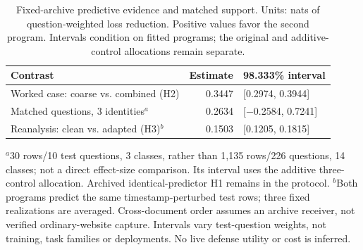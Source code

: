 \begin{table}[tp]
\centering\small
\caption{Fixed-archive predictive evidence and matched support. Units: nats of question-weighted loss reduction. Positive values favor the second program. Intervals condition on fitted programs; the original and additive-control allocations remain separate.}
\label{tab:public-trace-results}
\begin{tabularx}{\columnwidth}{Y r p{0.34\columnwidth}}
\toprule
Contrast & Estimate & 98.333\% interval \\
\midrule
Worked case: coarse vs. combined (H2) & 0.3447 & [0.2974, 0.3944] \\
Matched questions, 3 identities$^{a}$ & 0.2634 & [$-$0.2584, 0.7241] \\
Reanalysis: clean vs. adapted (H3)$^{b}$ & 0.1503 & [0.1205, 0.1815] \\
\bottomrule
\end{tabularx}
\par\smallskip\raggedright\footnotesize
$^{a}$30 rows/10 test questions, 3 classes, rather than 1,135 rows/226 questions, 14 classes; not a direct effect-size comparison. Its interval uses the additive three-control allocation. Archived identical-predictor H1 remains in the protocol.\newline
$^{b}$Both programs predict the same timestamp-perturbed test rows; three fixed realizations are averaged.\newline
Cross-document order assumes an archive receiver, not verified ordinary-website capture. Intervals vary test-question weights, not training, task families or deployments. No live defense utility or cost is inferred.
\end{table}
